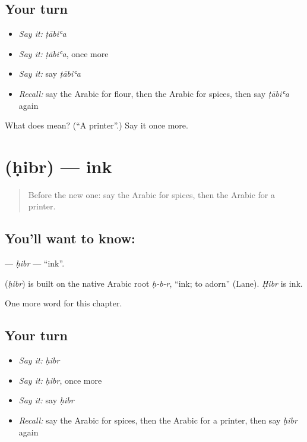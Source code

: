 \subsection*{Your turn}
\begin{itemize}
\raggedright
  \item \emph{Say it:} \emph{ṭābiʿa}
  \item \emph{Say it:} \emph{ṭābiʿa}, once more
  \item \emph{Say it:} say \emph{ṭābiʿa}
  \item \emph{Recall:} say the Arabic for flour, then the Arabic for spices, then say \emph{ṭābiʿa} again
\end{itemize}

\begin{tcolorbox}[breakable,colback=teal!4,colframe=teal!35!black,title={Before you move on}]
What does  mean? (\textquotedblleft{}A printer\textquotedblright{}.) Say it once more.
\end{tcolorbox}
\section[\texorpdfstring{\ar{حبر} (ḥibr)}{حبر (ḥibr)}]{ (ḥibr) — ink}

\label{lesson:AR-C274-hibr}



\begin{quote}
Before the new one: say the Arabic for spices, then the Arabic for a printer.
\end{quote}

\subsection*{You'll want to know: }
\textbf{} — \emph{ḥibr} — \textquotedblleft{}ink\textquotedblright{}.

\begin{cousinweb}
\textbf{} (\emph{ḥibr}) is built on the native Arabic root \emph{ḥ-b-r}, \textquotedblleft{}ink; to adorn\textquotedblright{} (Lane). \emph{Ḥibr} is ink.
\end{cousinweb}

\begin{grammarlens}[title={What you've built}]
One more word for this chapter.
\end{grammarlens}

\subsection*{Your turn}
\begin{itemize}
\raggedright
  \item \emph{Say it:} \emph{ḥibr}
  \item \emph{Say it:} \emph{ḥibr}, once more
  \item \emph{Say it:} say \emph{ḥibr}
  \item \emph{Recall:} say the Arabic for spices, then the Arabic for a printer, then say \emph{ḥibr} again
\end{itemize}

